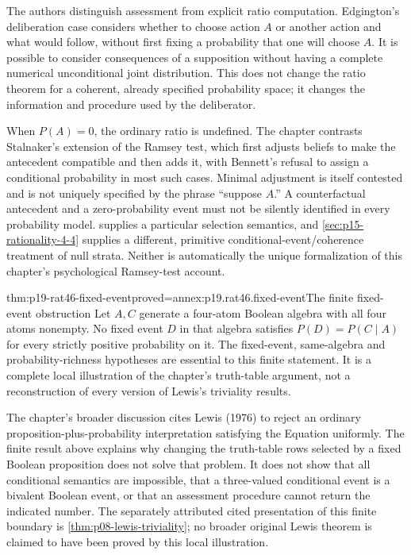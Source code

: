 The authors distinguish assessment from explicit ratio computation.
Edgington's deliberation case considers whether to choose action \(A\)
or another action and what would follow, without first fixing a probability
that one will choose \(A\). It is possible to consider consequences of
a supposition without having a complete numerical unconditional joint
distribution. This does not change the ratio theorem for a coherent,
already specified probability space; it changes the information and
procedure used by the deliberator.

When \(P(A)=0\), the ordinary ratio is undefined. The chapter contrasts
Stalnaker's extension of the Ramsey test, which first adjusts beliefs to
make the antecedent compatible and then adds it, with Bennett's refusal
to assign a conditional probability in most such cases. Minimal adjustment
is itself contested and is not uniquely specified by the phrase
``suppose \(A\).'' A counterfactual antecedent and a zero-probability
event must not be silently identified in every probability model.
 supplies a particular selection
semantics, and \cref{sec:p15-rationality-4-4} supplies a different,
primitive conditional-event/coherence treatment of null strata. Neither
is automatically the unique formalization of this chapter's psychological
Ramsey-test account.

\begin{hbtheorem}{thm:p19-rat46-fixed-event}{proved=annex:p19.rat46.fixed-event}{The finite fixed-event obstruction}
Let \(A,C\) generate a four-atom Boolean algebra with all four atoms
nonempty. No fixed event \(D\) in that algebra satisfies
\(P(D)=P(C\mid A)\) for every strictly positive probability on it.
The fixed-event, same-algebra and probability-richness hypotheses are
essential to this finite statement. It is a complete local illustration
of the chapter's truth-table argument, not a reconstruction of every
version of Lewis's triviality results.
\end{hbtheorem}

The chapter's broader discussion cites Lewis (1976) to reject an ordinary
proposition-plus-probability interpretation satisfying the Equation
uniformly. The finite result above explains why changing the truth-table
rows selected by a fixed Boolean proposition does not solve that problem.
It does not show that all conditional semantics are impossible, that a
three-valued conditional event is a bivalent Boolean event, or that an
assessment procedure cannot return the indicated number. The separately
attributed cited presentation of this finite boundary is
\cref{thm:p08-lewis-triviality}; no broader original Lewis theorem is
claimed to have been proved by this local illustration.

